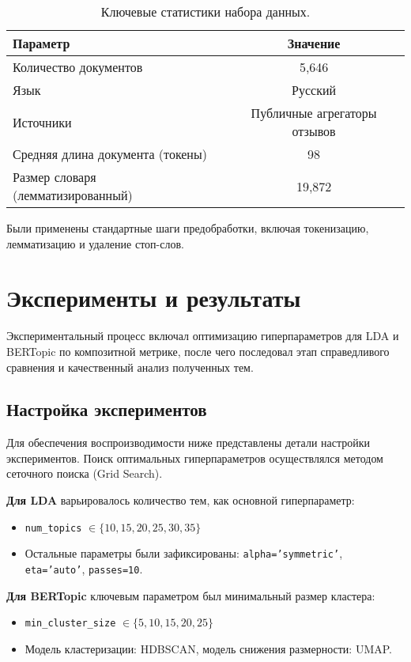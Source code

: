 \documentclass{article}
\begin{document}
\begin{table}[tbh!]
\centering
\begin{tabular}{lc}
\toprule
\textbf{Параметр} & \textbf{Значение} \\
\midrule
Количество документов & 5,646 \\
Язык & Русский \\
Источники & Публичные агрегаторы отзывов \\
Средняя длина документа (токены) & 98 \\
Размер словаря (лемматизированный) & 19,872 \\
\bottomrule
\end{tabular}
\caption{Ключевые статистики набора данных.}
\label{tab:dataset_stats}
\end{table}

Были применены стандартные шаги предобработки, включая токенизацию, лемматизацию и удаление стоп-слов.

\section{Эксперименты и результаты}
Экспериментальный процесс включал оптимизацию гиперпараметров для LDA и BERTopic по композитной метрике, после чего последовал этап справедливого сравнения и качественный анализ полученных тем.

\subsection{Настройка экспериментов}
Для обеспечения воспроизводимости ниже представлены детали настройки экспериментов. Поиск оптимальных гиперпараметров осуществлялся методом сеточного поиска (Grid Search).

\textbf{Для LDA} варьировалось количество тем, как основной гиперпараметр:
\begin{itemize}
    \item \texttt{num\_topics} $\in \{10, 15, 20, 25, 30, 35\}$
    \item Остальные параметры были зафиксированы: \texttt{alpha='symmetric'}, \texttt{eta='auto'}, \texttt{passes=10}.
\end{itemize}

\textbf{Для BERTopic} ключевым параметром был минимальный размер кластера:
\begin{itemize}
    \item \texttt{min\_cluster\_size} $\in \{5, 10, 15, 20, 25\}$
    \item Модель кластеризации: HDBSCAN, модель снижения размерности: UMAP.
\end{itemize}
\end{document}
